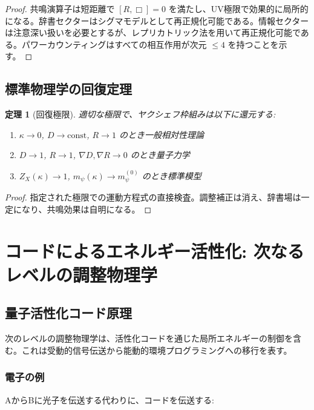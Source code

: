 \documentclass[11pt,a4paper]{article}
\newtheorem{theorem}{定理}
\begin{document}
	\begin{proof}
		共鳴演算子は短距離で $[R, \Box] = 0$ を満たし、UV極限で効果的に局所的になる。辞書セクターはシグマモデルとして再正規化可能である。情報セクターは注意深い扱いを必要とするが、レプリカトリック法を用いて再正規化可能である。パワーカウンティングはすべての相互作用が次元 $\leq 4$ を持つことを示す。
	\end{proof}
	
	\subsection{標準物理学の回復定理}
	
	\begin{theorem}[回復極限]
		適切な極限で、ヤクシェフ枠組みは以下に還元する:
		\begin{enumerate}
			\item $\kappa \to 0$, $D \to \text{const}$, $R \to 1$ のとき一般相対性理論
			\item $D \to 1$, $R \to 1$, $\nabla D, \nabla R \to 0$ のとき量子力学
			\item $Z_X(\kappa) \to 1$, $m_\psi(\kappa) \to m_\psi^{(0)}$ のとき標準模型
		\end{enumerate}
	\end{theorem}
	
	\begin{proof}
		指定された極限での運動方程式の直接検査。調整補正は消え、辞書場は一定になり、共鳴効果は自明になる。
	\end{proof}
	
	\section{コードによるエネルギー活性化: 次なるレベルの調整物理学}
	\label{sec:energy-activation}
	
	\subsection{量子活性化コード原理}
	
	次のレベルの調整物理学は、活性化コードを通じた局所エネルギーの制御を含む。これは受動的信号伝送から能動的環境プログラミングへの移行を表す。
	
	\subsubsection{電子の例}
	AからBに光子を伝送する代わりに、コードを伝送する:
	
\end{document}
